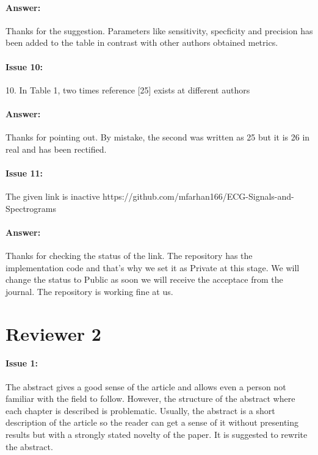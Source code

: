 \documentclass{article}
\begin{document}
\paragraph{Answer:}
Thanks for the suggestion. Parameters like sensitivity, specficity and precision has been added to the table in contrast with other authors obtained metrics. 

\paragraph{Issue 10:}
\begin{displayquote}
10. In Table 1, two times reference [25] exists at different authors
\end{displayquote}

\paragraph{Answer:}
Thanks for pointing out. By mistake, the second was written as 25 but it is 26 in real and has been rectified.

\paragraph{Issue 11:}
\begin{displayquote}
The given link is inactive https://github.com/mfarhan166/ECG-Signals-and-Spectrograms
\end{displayquote}

\paragraph{Answer:}
Thanks for checking the status of the link. The repository has the implementation code and that's why we set it as Private at this stage. We will change the status to Public as soon we will receive the acceptace from the journal. The repository is working fine at us. 




\section{Reviewer 2}

\paragraph{Issue 1:}
\begin{displayquote}
The abstract gives a good sense of the article and allows even a person not familiar with the field to follow. However, the structure of the abstract where each chapter is described is problematic. Usually, the abstract is a short description of the article so the reader can get a sense of it without presenting results but with a strongly stated novelty of the paper. It is suggested to rewrite the abstract.
\end{displayquote}
\end{document}

